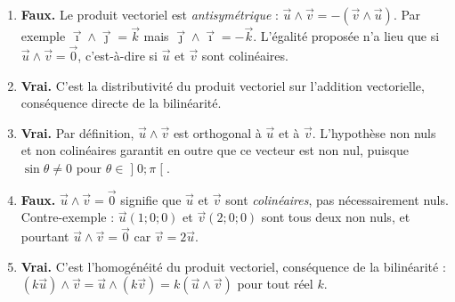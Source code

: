 \documentclass[11pt]{article}
\begin{document}
\begin{corrige}
\begin{enumerate}
\item \textbf{Faux.} Le produit vectoriel est \emph{antisymétrique} : $\vec{u} \wedge \vec{v} = -(\vec{v} \wedge \vec{u})$. Par exemple $\vec{\imath} \wedge \vec{\jmath} = \vec{k}$ mais $\vec{\jmath} \wedge \vec{\imath} = -\vec{k}$. L'égalité proposée n'a lieu que si $\vec{u} \wedge \vec{v} = \vec{0}$, c'est-à-dire si $\vec{u}$ et $\vec{v}$ sont colinéaires.
\item \textbf{Vrai.} C'est la distributivité du produit vectoriel sur l'addition vectorielle, conséquence directe de la bilinéarité.
\item \textbf{Vrai.} Par définition, $\vec{u} \wedge \vec{v}$ est orthogonal à $\vec{u}$ et à $\vec{v}$. L'hypothèse \og non nuls et non colinéaires \fg{} garantit en outre que ce vecteur est non nul, puisque $\sin\theta \neq 0$ pour $\theta \in \mathopen]0 ; \pi\mathclose[$.
\item \textbf{Faux.} $\vec{u} \wedge \vec{v} = \vec{0}$ signifie que $\vec{u}$ et $\vec{v}$ sont \emph{colinéaires}, pas nécessairement nuls. Contre-exemple : $\vec{u}(1;0;0)$ et $\vec{v}(2;0;0)$ sont tous deux non nuls, et pourtant $\vec{u} \wedge \vec{v} = \vec{0}$ car $\vec{v} = 2\vec{u}$.
\item \textbf{Vrai.} C'est l'homogénéité du produit vectoriel, conséquence de la bilinéarité : $(k\vec{u}) \wedge \vec{v} = \vec{u} \wedge (k\vec{v}) = k(\vec{u} \wedge \vec{v})$ pour tout réel $k$.
\end{enumerate}
\end{corrige}
\end{document}
